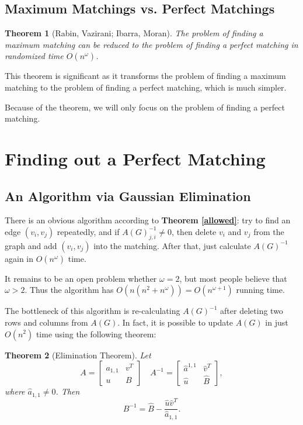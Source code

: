 \documentclass{article}
\newtheorem{theorem}{Theorem}
\begin{document}
		\subsection{Maximum Matchings vs. Perfect Matchings}
			
			\begin{theorem}[Rabin, Vazirani; Ibarra, Moran]
				The problem of finding a maximum matching can be reduced to the problem of finding a perfect matching in randomized time $O(n^\omega)$.
				\label{maximum}
			\end{theorem}

			This theorem is significant as it transforms the problem of finding a maximum matching to the problem of finding a perfect matching, which is much simpler.

			Because of the theorem, we will only focus on the problem of finding a perfect matching.

	\section{Finding out a Perfect Matching}
		\subsection{An Algorithm via Gaussian Elimination}

			There is an obvious algorithm according to {\bfseries Theorem \ref{allowed}}: try to find an edge $(v_i, v_j)$ repeatedly, and if $A(G)^{-1}_{j, i} \ne 0$, then delete $v_i$ and $v_j$ from the graph and add $(v_i, v_j)$ into the matching. After that, just calculate $A(G)^{-1}$ again in $O(n^\omega)$ time.

			It remains to be an open problem whether $\omega = 2$, but most people believe that $\omega > 2$. Thus the algorithm has $O(n (n^2 + n^\omega)) = O(n^{\omega + 1})$ running time.
			
			The bottleneck of this algorithm is re-calculating $A(G)^{-1}$ after deleting two rows and columns from $A(G)$. In fact, it is possible to update $A(G)$ in just $O(n^2)$ time using the following theorem:

			\begin{theorem} [Elimination Theorem]
				Let
				$$ A = \begin{bmatrix}
					a_{1, 1} & v^T \\
					u & B
				\end{bmatrix} \quad A^{-1} = \begin{bmatrix}
					\hat a^{1, 1} & \hat v^T \\
					\hat u & \hat B
				\end{bmatrix} , $$
				where $\hat a_{1, 1} \ne 0$. Then
				$$ B^{-1} = \hat B - \frac {\hat u \hat v^T} {\hat a_{1, 1}}. $$
				\label{elimination}
			\end{theorem}
\end{document}
